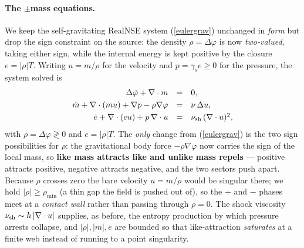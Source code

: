 \paragraph{The $\pm$mass equations.} We keep the self-gravitating RealNSE system (\ref{eulergrav}) unchanged in
\emph{form} but drop the sign constraint on the source: the density $\rho=\Delta\varphi$ is now \emph{two-valued},
taking either sign, while the internal energy is kept positive by the closure $e=|\rho|T$. Writing $u=m/\rho$ for the
velocity and $p=\gamma_s e\ge0$ for the pressure, the system solved is
\begin{equation}\label{pmflowbook}
\begin{array}{rcl}
\Delta\dot\varphi+\nabla\cdot m &=& 0,\\[3pt]
\dot m+\nabla\cdot (mu)+\nabla p-\rho\nabla\varphi &=& \nu\,\Delta u,\\[3pt]
\dot e+\nabla\cdot (eu)+p\,\nabla\cdot u &=& \nu_{\rm sh}\,(\nabla\cdot u)^2,
\end{array}
\end{equation}
with $\rho=\Delta\varphi\gtrless0$ and $e=|\rho|T$. The \emph{only} change from (\ref{eulergrav}) is the two sign
possibilities for $\rho$: the gravitational body force $-\rho\nabla\varphi$ now carries the sign of the local mass,
so \textbf{like mass attracts like and unlike mass repels} --- positive attracts positive, negative attracts
negative, and the two sectors push apart. Because $\rho$ crosses zero the bare velocity $u=m/\rho$ would be singular
there; we hold $|\rho|\ge\rho_{\min}$ (a thin gap the field is pushed out of), so the $+$ and $-$ phases meet at a
\emph{contact wall} rather than passing through $\rho=0$. The shock viscosity $\nu_{\rm sh}\sim h\,|\nabla\cdot u|$
supplies, as before, the entropy production by which pressure arrests collapse, and $|\rho|,|m|,e$ are bounded so
that like-attraction \emph{saturates} at a finite web instead of running to a point singularity.


